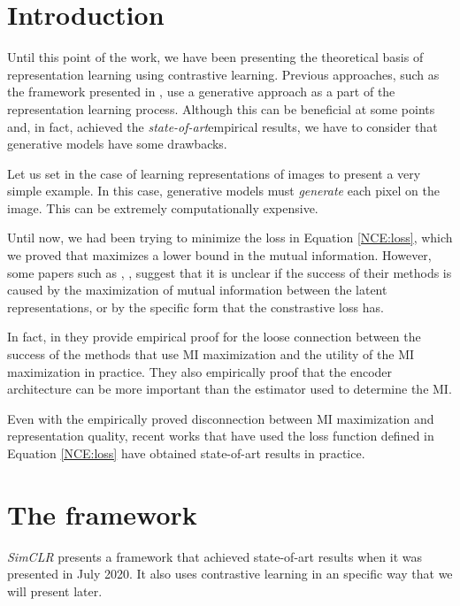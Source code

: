 \label{Chapter:SimCLR}
\section{Introduction}

Until this point of the work, we have been presenting the theoretical basis of representation learning using contrastive learning. Previous approaches, such as  the framework presented in \cite{oord_representation_2019}, use a generative approach as a part of the representation learning process. Although this can be beneficial at some points and, in fact, achieved the \emph{state-of-art}\footnotemark empirical results, we have to consider that generative models have some drawbacks. 



Let us set in the case of learning representations of images to present a very simple example. In this case, generative models must \emph{generate} each pixel on the image. This can be extremely computationally expensive. 

Until now, we had been trying to minimize the loss in Equation \eqref{NCE:loss}, which we proved that maximizes a lower bound in the mutual information. However, some papers such as \cite{chen_simple_2020}, \cite{tschannen_mutual_2020}, suggest that it is unclear if the success of their methods is caused by the maximization of mutual information between the latent representations, or by the specific form that the constrastive loss has.

In fact, in \cite{tschannen_mutual_2020} they provide empirical proof for the loose connection between the success of the methods that use MI maximization and the utility of the MI maximization in practice. They also empirically proof  that the encoder architecture can be more important than the estimator used to determine the MI.

Even with the empirically proved disconnection between MI maximization and representation quality, recent works that have used the loss function defined in Equation \eqref{NCE:loss} have obtained state-of-art results in practice. 

\section{The framework}

\emph{SimCLR} \citep{chen_simple_2020} presents a framework that achieved state-of-art results when it was presented in July 2020. It also uses contrastive learning in an specific way that we will present later. 

